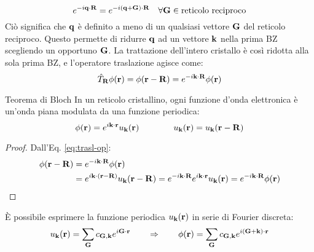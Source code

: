 \begin{equation*}
	e^{-i \mathbf{q} \cdot \mathbf{R}} = e^{-i (\mathbf{q} + \mathbf{G}) \cdot \mathbf{R}} \quad \forall \mathbf{G} \in \text{reticolo reciproco}
\end{equation*}
Ciò significa che $ \mathbf{q} $ è definito a meno di un qualsiasi vettore $ \mathbf{G} $ del reticolo reciproco. Questo permette di ridurre $ \mathbf{q} $ ad un vettore $ \mathbf{k} $ nella prima BZ scegliendo un opportuno $ \mathbf{G} $. La trattazione dell'intero cristallo è così ridotta alla sola prima BZ, e l'operatore traslazione agisce come:
\begin{equation}
	\hat{T}_{\mathbf{R}} \phi(\mathbf{r}) = \phi(\mathbf{r} - \mathbf{R}) = e^{-i \mathbf{k} \cdot \mathbf{R}} \phi(\mathbf{r})
	\label{eq:trasl-op}
\end{equation}

\begin{theorem}{Teorema di Bloch}{}
	In un reticolo cristallino, ogni funzione d'onda elettronica è un'onda piana modulata da una funzione periodica:
	\begin{equation}
		\phi(\mathbf{r}) = e^{i \mathbf{k} \cdot \mathbf{r}} u_{\mathbf{k}}(\mathbf{r})
		\qquad \qquad
		u_{\mathbf{k}}(\mathbf{r}) = u_{\mathbf{k}}(\mathbf{r} - \mathbf{R})
		\label{eq:bloch-th}
	\end{equation}

	\tcblower

	\begin{proof}
		Dall'Eq. \ref{eq:trasl-op}:
		\begin{equation*}
			\begin{split}
				\phi(\mathbf{r} - \mathbf{R})
				& = e^{-i \mathbf{k} \cdot \mathbf{R}} \phi(\mathbf{r}) \\
				& = e^{i \mathbf{k} \cdot (\mathbf{r} - \mathbf{R})} u_{\mathbf{k}}(\mathbf{r} - \mathbf{R}) = e^{-i \mathbf{k} \cdot \mathbf{R}} e^{i \mathbf{k} \cdot \mathbf{r}} u_{\mathbf{k}}(\mathbf{r}) = e^{-i \mathbf{k} \cdot \mathbf{R}} \phi(\mathbf{r})
			\end{split}
		\end{equation*}
	\end{proof}
\end{theorem}

È possibile esprimere la funzione periodica $ u_{\mathbf{k}}(\mathbf{r}) $ in serie di Fourier discreta:
\begin{equation}
	u_{\mathbf{k}}(\mathbf{r}) = \sum_{\mathbf{G}} c_{\mathbf{G},\mathbf{k}} e^{i \mathbf{G} \cdot \mathbf{r}}
	\qquad \Rightarrow \qquad
	\phi(\mathbf{r}) = \sum_{\mathbf{G}} c_{\mathbf{G},\mathbf{k}} e^{i (\mathbf{G} + \mathbf{k}) \cdot \mathbf{r}}
\end{equation}

